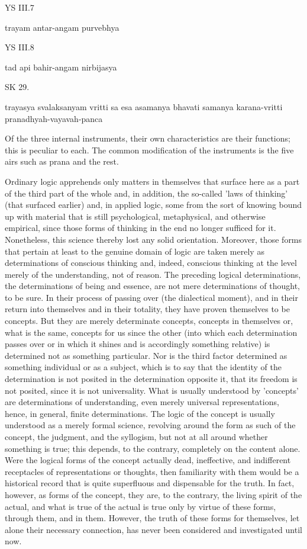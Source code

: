 YS III.7

trayam antar-angam purvebhya

YS III.8

tad api bahir-angam nirbijasya

SK 29.

trayasya svalaksanyam vritti sa esa asamanya bhavati
samanya karana-vritti pranadhyah-vayavah-panca

Of the three internal instruments, their own characteristics are their functions;
this is peculiar to each.
The common modification of the instruments is the five airs
such as prana and the rest.

Ordinary logic apprehends only matters in themselves that surface here
as a part of the third part of the whole and, in addition,
the so-called 'laws of thinking' (that surfaced earlier) and,
in applied logic, some from the sort of knowing bound up with material
that is still psychological, metaphysical, and otherwise empirical,
since those forms of thinking in the end no longer sufficed for it.
Nonetheless, this science thereby lost any solid orientation.
Moreover, those forms that pertain at least to the genuine domain of logic
are taken merely as determinations of conscious thinking and, indeed,
conscious thinking at the level merely of the understanding, not of reason.
The preceding logical determinations, the determinations of
being and essence, are not mere determinations of thought, to be sure.
In their process of passing over (the dialectical moment), and
in their return into themselves and in their totality,
they have proven themselves to be concepts.
But they are merely determinate concepts, concepts in themselves or,
what is the same, concepts for us since the other
(into which each determination passes over or in which it shines and
is accordingly something relative)
is determined not as something particular.
Nor is the third factor determined as something individual or as a subject,
which is to say that the identity of the determination is not posited in
the determination opposite it, that its freedom is not posited,
since it is not universality.
What is usually understood by 'concepts' are determinations of understanding,
even merely universal representations, hence, in general, finite determinations.
The logic of the concept is usually understood as a merely formal science,
revolving around the form as such of the concept, the judgment, and the syllogism,
but not at all around whether something is true;
this depends, to the contrary, completely on the content alone.
Were the logical forms of the concept actually dead, ineffective,
and  indifferent receptacles of representations or thoughts,
then familiarity with them would be a historical record that
is quite superfluous and dispensable for the truth.
In fact, however, as forms of the concept, they are, to the contrary,
the living spirit of the actual, and what is true of the actual is true
only by virtue of these forms, through them, and in them.
However, the truth of these forms for themselves,
let alone their necessary connection,
has never been considered and investigated until now.

